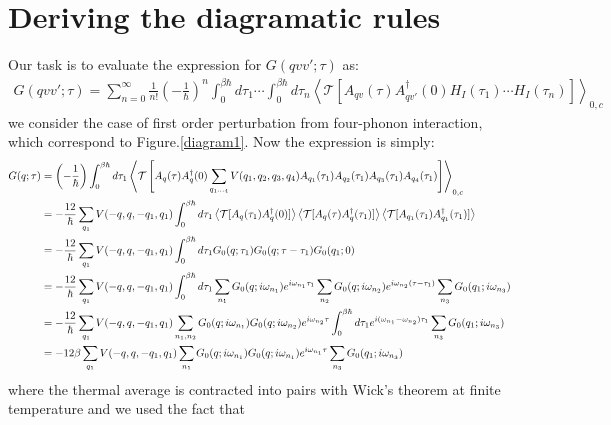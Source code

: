 \documentclass{article}
\begin{document}
\section{Deriving the diagramatic rules}
Our task is to evaluate the expression for $G(qvv';\tau)$ as:
\begin{align}
    G(qvv';\tau)= \sum_{n=0}^{\infty} \frac{1}{n!} \left( -\frac{1}{\hbar} \right)^{n} 
    \int_0^{\beta\hbar} d\tau_1 \cdots \int_0^{\beta\hbar} d\tau_{n} \left\langle \mathcal{T}[ A_{qv}(\tau) A_{qv'}^{\dagger}(0) H_I(\tau_1) \cdots H_I(\tau_{n}) ] \right\rangle_{0,c} 
\end{align}
we consider the case of first order perturbation from four-phonon interaction, which correspond to Figure.\ref{diagram1}. Now the 
expression is simply:
\begin{align}
    G(q;\tau)&= \left( -\frac{1}{\hbar} \right) 
    \int_0^{\beta\hbar} d\tau_1 \left\langle \mathcal{T}\left[ A_{q}(\tau) A_{q}^{\dagger}(0) \sum_{q_{1\cdots 4}}V(q_1,q_2,q_3,q_4) A_{q_1}(\tau_1)A_{q_2}(\tau_1)A_{q_3}(\tau_1)A_{q_4}(\tau_1)\right] \right\rangle_{0,c} \notag \\
    &= -\frac{12}{\hbar}  
    \sum_{q_1} V(-q,q,-q_1,q_1) \int_0^{\beta\hbar} d\tau_1 \left\langle \mathcal{T}[ A_q(\tau_1)A_{q}^{\dagger}(0) ] \right\rangle
    \left\langle \mathcal{T}[ A_{q}(\tau)A_{q}^{\dagger}(\tau_1) ] \right\rangle 
    \left\langle \mathcal{T}[ A_{q_1}(\tau_1)A_{q_1}^{\dagger}(\tau_1) ] \right\rangle \notag \\
    &= -\frac{12}{\hbar} \sum_{q_1} V(-q,q,-q_1,q_1) \int_0^{\beta\hbar} d\tau_1 G_0(q;\tau_1) G_0(q;\tau-\tau_1) G_0(q_1;0) \notag \\
    &= -\frac{12}{\hbar} \sum_{q_1} V(-q,q,-q_1,q_1) \int_0^{\beta\hbar} d\tau_1 
        \sum_{n_1}G_0(q;i\omega_{n_1}) e^{i\omega_{n_1}\tau_1} 
        \sum_{n_2}G_0(q;i\omega_{n_2}) e^{i\omega_{n_2}(\tau-\tau_1)} 
        \sum_{n_3}G_0(q_1;i\omega_{n_3}) \notag \\
    &= -\frac{12}{\hbar} \sum_{q_1} V(-q,q,-q_1,q_1) \sum_{n_1,n_2} G_0(q;i\omega_{n_1}) G_0(q;i\omega_{n_2}) e^{i\omega_{n_2}\tau} 
        \int_0^{\beta\hbar} d\tau_1 e^{i(\omega_{n_1}-\omega_{n_2})\tau_1} \sum_{n_3}G_0(q_1;i\omega_{n_3}) \notag \\
    &= -12\beta \sum_{q_1} V(-q,q,-q_1,q_1) \sum_{n_1} G_0(q;i\omega_{n_1}) G_0(q;i\omega_{n_1}) e^{i\omega_{n_1}\tau} 
        \sum_{n_3}G_0(q_1;i\omega_{n_3})
\end{align}
where the thermal average is contracted into pairs with Wick's theorem at finite temperature and we used the fact that
\end{document}
